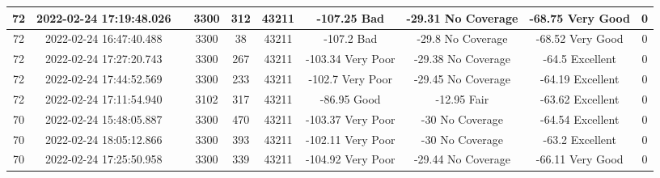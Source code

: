 \begin{longtable*}{|c|c|c|c|c|c|c|c|c|c|}
72&2022-02-24 17:19:48.026&&3300&312&43211& -107.25   Bad         & -29.31    No Coverage & -68.75    Very Good   & 0\\\hline
{}72&2022-02-24 16:47:40.488&&3300&38&43211& -107.2    Bad         & -29.8     No Coverage & -68.52    Very Good   & 0\\\hline
{}72&2022-02-24 17:27:20.743&&3300&267&43211& -103.34   Very Poor   & -29.38    No Coverage & -64.5     Excellent   & 0\\\hline
{}72&2022-02-24 17:44:52.569&&3300&233&43211& -102.7    Very Poor   & -29.45    No Coverage & -64.19    Excellent   & 0\\\hline
{}72&2022-02-24 17:11:54.940&&3102&317&43211& -86.95    Good        & -12.95    Fair        & -63.62    Excellent   & 0\\\hline
{}70&2022-02-24 15:48:05.887&&3300&470&43211& -103.37   Very Poor   & -30       No Coverage & -64.54    Excellent   & 0\\\hline
{}70&2022-02-24 18:05:12.866&&3300&393&43211& -102.11   Very Poor   & -30       No Coverage & -63.2     Excellent   & 0\\\hline
{}70&2022-02-24 17:25:50.958&&3300&339&43211& -104.92   Very Poor   & -29.44    No Coverage & -66.11    Very Good   & 0\\\hline

\end{longtable*}
